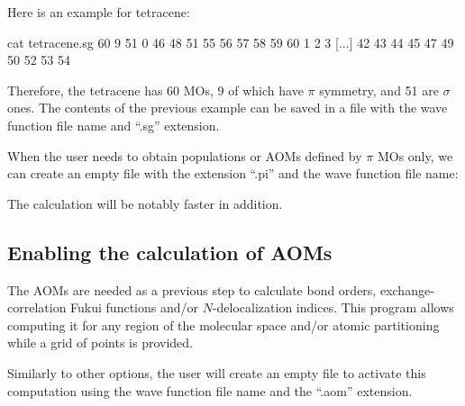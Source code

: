 \documentclass[a4paper,11pt,openany]{memoir}
\begin{document}
Here is an example for tetracene:
	\begin{consola}{cat tetracene.sg}
60 9 51 0
46 48 51 55 56 57 58 59 60
1 2 3 [...] 42 43 44 45 47 49 50 52 53 54
	\end{consola}
Therefore, the tetracene has 60 \acp{MO}, 9 of which have $\pi$ symmetry, and 51 are $\sigma$ ones. The contents of the previous example can be saved in a file with the wave function file name and ``.sg'' extension.

When the user needs to obtain populations or \acp{AOM} defined by $\pi$ \acp{MO} only, we can create an empty file with the extension ``.pi'' and the wave function file name:

The calculation will be notably faster in addition.

\subsection{Enabling the calculation of \acfp{AOM}}
The \acfp{AOM} are needed as a previous step to calculate bond orders, exchange-correlation Fukui functions and/or $N$-delocalization indices. This program allows computing it for any region of the molecular space and/or atomic partitioning while a grid of points is provided.

Similarly to other options, the user will create an empty file to activate this computation using the wave function file name and the ``.aom'' extension.
\end{document}
